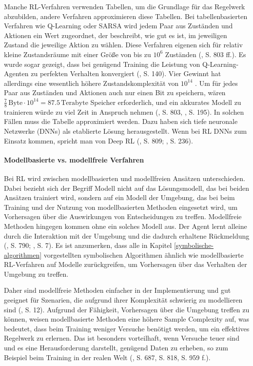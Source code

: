 Manche RL-Verfahren verwenden Tabellen, um die Grundlage für das Regelwerk abzubilden, andere Verfahren approximieren diese Tabellen. Bei tabellenbasierten Verfahren wie Q-Learning oder SARSA wird jedem Paar aus Zuständen und Aktionen ein Wert zugeordnet, der beschreibt, wie gut es ist, im jeweiligen Zustand die jeweilige Aktion zu wählen. Diese Verfahren eigenen sich für relativ kleine Zustandsräume mit einer Größe von bis zu $10^{6}$ Zuständen (\cite{Russell.2020}, S. 803 ff.). Es wurde sogar gezeigt, dass bei genügend Training die Leistung von Q-Learning-Agenten zu perfekten Verhalten konvergiert (\cite{Sutton.2018}, S. 140). Vier Gewinnt hat allerdings eine wesentlich höhere Zustandskomplexität von $10^{14}$ \cite{Allis.1994}. Um für jedes Paar aus Zuständen und Aktionen auch nur einen Bit zu speichern, wären $\frac{7}{8} \, \text{Byte} \cdot 10^{14} = 87.5 \, \text{Terabyte}$ Speicher erforderlich, und ein akkurates Modell zu trainieren würde zu viel Zeit in Anspruch nehmen (\cite{Russell.2020}, S. 803, \cite{Sutton.2018}, S. 195). In solchen Fällen muss die Tabelle approximiert werden. Dazu haben sich tiefe neuronale Netzwerke (DNNs) als etablierte Lösung herausgestellt. Wenn bei RL DNNs zum Einsatz kommen, spricht man von Deep RL (\cite{Russell.2020}, S. 809; \cite{Sutton.2018}, S. 236).

\paragraph{Modellbasierte vs. modellfreie Verfahren}

Bei RL wird zwischen modellbasierten und modellfreien Ansätzen unterschieden. Dabei bezieht sich der Begriff \glqq Modell\grqq{} nicht auf das Lösungsmodell, das bei beiden Ansätzen trainiert wird, sondern auf ein Modell der Umgebung, das bei beim Training und der Nutzung von modellbasierten Methoden eingesetzt wird, um Vorhersagen über die Auswirkungen von Entscheidungen zu treffen. Modellfreie Methoden hingegen kommen ohne ein solches Modell aus. Der Agent lernt alleine durch die Interaktion mit der Umgebung und die dadurch erhaltene Rückmeldung (\cite{Russell.2020}, S. 790; \cite{Sutton.2018}, S. 7). Es ist anzumerken, dass alle in Kapitel \ref{symbolische-algorithmen} vorgestellten symbolischen Algorithmen ähnlich wie modellbasierte RL-Verfahren auf Modelle zurückgreifen, um Vorhersagen über das Verhalten der Umgebung zu treffen.

Daher sind modellfreie Methoden einfacher in der Implementierung und gut geeignet für Szenarien, die aufgrund ihrer Komplexität schwierig zu modellieren sind (\cite{Sutton.2018}, S. 12). Aufgrund der Fähigkeit, Vorhersagen über die Umgebung treffen zu können, weisen modellbasierte Methoden eine höhere Sample Complexity auf, was bedeutet, dass beim Training weniger Versuche benötigt werden, um ein effektives Regelwerk zu erlernen. Das ist besonders vorteilhaft, wenn Versuche teuer sind und es eine Herausforderung darstellt, genügend Daten zu erheben, so zum Beispiel beim Training in der realen Welt (\cite{Russell.2020}, S. 687, S. 818, S. 959 f.).


